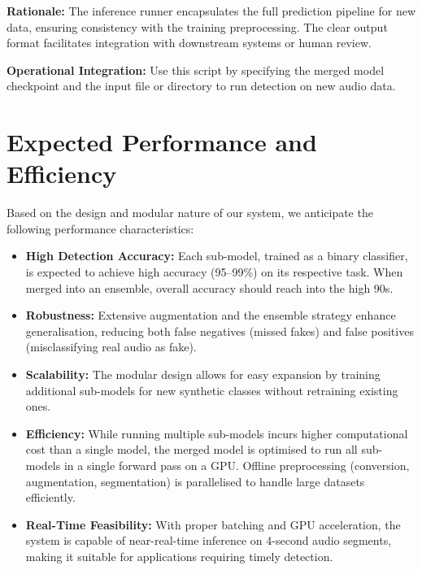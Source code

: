 \documentclass[conference]{IEEEtran}  %
\begin{document}
\textbf{Rationale:} The inference runner encapsulates the full prediction pipeline for new data, ensuring consistency with the training preprocessing. The clear output format facilitates integration with downstream systems or human review.

\textbf{Operational Integration:} Use this script by specifying the merged model checkpoint and the input file or directory to run detection on new audio data.

\section{Expected Performance and Efficiency}
Based on the design and modular nature of our system, we anticipate the following performance characteristics:
\begin{itemize}
    \item \textbf{High Detection Accuracy:} Each sub-model, trained as a binary classifier, is expected to achieve high accuracy (95--99\%) on its respective task. When merged into an ensemble, overall accuracy should reach into the high 90s.
    \item \textbf{Robustness:} Extensive augmentation and the ensemble strategy enhance generalisation, reducing both false negatives (missed fakes) and false positives (misclassifying real audio as fake).
    \item \textbf{Scalability:} The modular design allows for easy expansion by training additional sub-models for new synthetic classes without retraining existing ones.
    \item \textbf{Efficiency:} While running multiple sub-models incurs higher computational cost than a single model, the merged model is optimised to run all sub-models in a single forward pass on a GPU. Offline preprocessing (conversion, augmentation, segmentation) is parallelised to handle large datasets efficiently.
    \item \textbf{Real-Time Feasibility:} With proper batching and GPU acceleration, the system is capable of near-real-time inference on 4-second audio segments, making it suitable for applications requiring timely detection.
\end{itemize}
\end{document}
